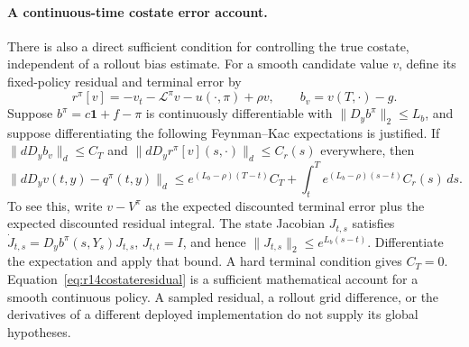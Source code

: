 \paragraph*{A continuous-time costate error account.}
There is also a direct sufficient condition for controlling the true
costate, independent of a rollout bias estimate. For a smooth candidate
value $v$, define its fixed-policy residual and terminal error by
\[
 r^\pi[v]=-v_t-\mathcal L^\pi v-u(\cdot,\pi)+\rho v,
 \qquad b_v=v(T,\cdot)-g.
\]
Suppose $b^\pi=c\bm1+f-\pi$ is continuously differentiable with
$\|D_yb^\pi\|_2\leq L_b$, and suppose differentiating the following
Feynman--Kac expectations is justified. If
$\|dD_yb_v\|_d\leq C_T$ and
$\|dD_yr^\pi[v](s,\cdot)\|_d\leq C_r(s)$ everywhere, then
\begin{equation}\label{eq:r14costateresidual}
 \|dD_yv(t,y)-q^\pi(t,y)\|_d
 \leq e^{(L_b-\rho)(T-t)}C_T
       +\int_t^T e^{(L_b-\rho)(s-t)}C_r(s)\,ds.
\end{equation}
To see this, write $v-V^\pi$ as the expected discounted terminal error
plus the expected discounted residual integral. The state Jacobian
$J_{t,s}$ satisfies
$\dot J_{t,s}=D_yb^\pi(s,Y_s)J_{t,s}$, $J_{t,t}=I$, and hence
$\|J_{t,s}\|_2\leq e^{L_b(s-t)}$. Differentiate the expectation and
apply that bound. A hard terminal condition gives $C_T=0$.
Equation~\eqref{eq:r14costateresidual} is a sufficient mathematical
account for a smooth continuous policy. A sampled residual, a rollout
grid difference, or the derivatives of a different deployed
implementation do not supply its global hypotheses.
